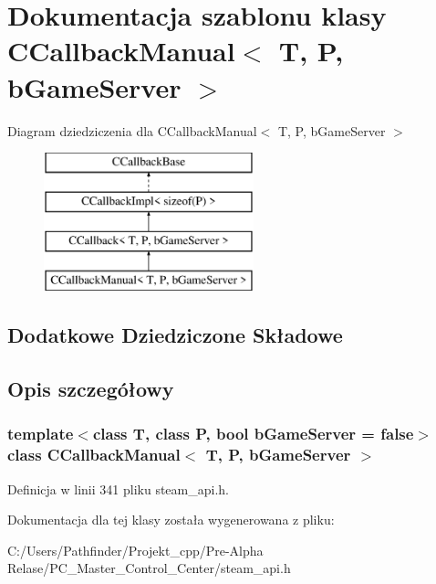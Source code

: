 \hypertarget{class_c_callback_manual}{}\section{Dokumentacja szablonu klasy C\+Callback\+Manual$<$ T, P, b\+Game\+Server $>$}
\label{class_c_callback_manual}
Diagram dziedziczenia dla C\+Callback\+Manual$<$ T, P, b\+Game\+Server $>$\begin{figure}[H]
\begin{center}
\leavevmode
\includegraphics[height=4.000000cm]{class_c_callback_manual}
\end{center}
\end{figure}
\subsection*{Dodatkowe Dziedziczone Składowe}


\subsection{Opis szczegółowy}
\subsubsection*{template$<$class T, class P, bool b\+Game\+Server = false$>$\newline
class C\+Callback\+Manual$<$ T, P, b\+Game\+Server $>$}



Definicja w linii 341 pliku steam\+\_\+api.\+h.



Dokumentacja dla tej klasy została wygenerowana z pliku\+:\begin{DoxyCompactItemize}
\item 
C\+:/\+Users/\+Pathfinder/\+Projekt\+\_\+cpp/\+Pre-\/\+Alpha Relase/\+P\+C\+\_\+\+Master\+\_\+\+Control\+\_\+\+Center/steam\+\_\+api.\+h\end{DoxyCompactItemize}
